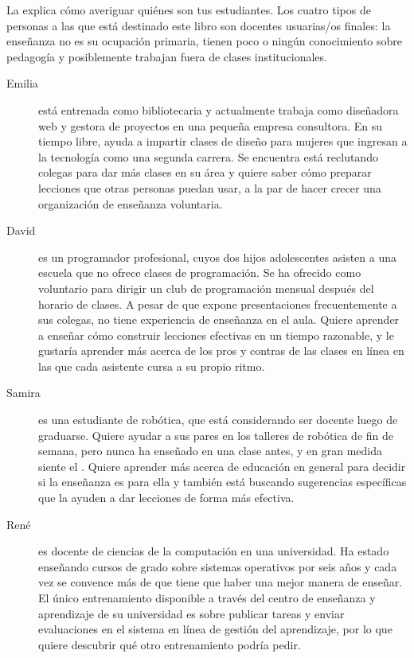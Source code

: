
La  explica cómo averiguar quiénes son tus estudiantes. 
Los cuatro tipos de personas a las que está destinado este libro son docentes usuarias/os finales: 
la enseñanza no es su ocupación primaria, tienen poco o ningún conocimiento sobre pedagogía y 
posiblemente trabajan fuera de clases institucionales.

\begin{description}

\item[Emilia]
está entrenada como bibliotecaria
y actualmente trabaja como diseñadora web y gestora de proyectos en una pequeña empresa consultora.
En su tiempo libre, ayuda a impartir clases de diseño para mujeres que ingresan a la tecnología como una segunda carrera.
Se encuentra está reclutando colegas para dar más clases en su área
y quiere saber cómo preparar lecciones que otras personas puedan usar,
a la par de hacer crecer una organización de enseñanza voluntaria.

\item[David]
es un programador profesional, cuyos dos hijos adolescentes
asisten a una escuela que no ofrece clases de programación.
Se ha ofrecido como voluntario para dirigir un club de programación mensual después del horario de clases.
A pesar de que expone presentaciones frecuentemente a sus colegas,
no tiene experiencia de enseñanza en el aula.
Quiere aprender a enseñar cómo construir lecciones efectivas en un tiempo razonable,
y le gustaría aprender más acerca de los pros y contras de las clases en línea en las que cada asistente cursa a su propio ritmo.

\item[Samira]
es una estudiante de robótica, que está considerando ser docente luego de graduarse.
Quiere ayudar a sus pares en los talleres de robótica de fin de semana,
pero nunca ha enseñado en una clase antes,
y en gran medida siente el .
Quiere aprender más acerca de educación en general para decidir si la enseñanza es para ella
y también está buscando sugerencias específicas que la ayuden a dar lecciones 
de forma más efectiva. 

\item[René]
es docente de ciencias de la computación en una universidad.
Ha estado enseñando cursos de grado sobre sistemas operativos por seis años
y cada vez se convence más de que tiene que haber una mejor manera de enseñar.
El único entrenamiento disponible a través del centro de enseñanza y aprendizaje de su universidad 
es sobre publicar tareas y enviar evaluaciones en el sistema en línea de gestión del aprendizaje,
por lo que quiere descubrir qué otro entrenamiento podría pedir.

\end{description}
